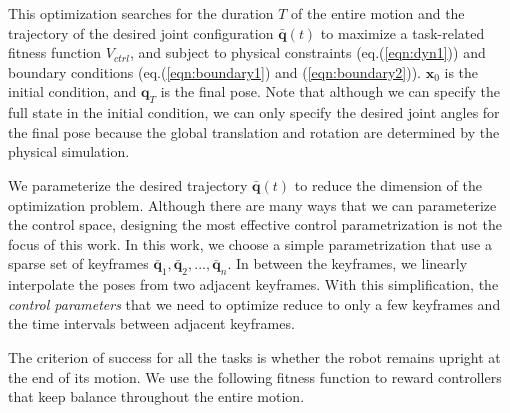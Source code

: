 This optimization searches for the duration $T$ of the entire motion and the trajectory of the desired joint configuration $\bar{\mathbf{q}}(t)$ to maximize a task-related fitness function $V_{ctrl}$, and subject to physical constraints (eq.(\ref{eqn:dyn1})) and boundary conditions (eq.(\ref{eqn:boundary1}) and (\ref{eqn:boundary2})). $\mathbf{x}_0$ is the initial condition, and $\mathbf{q}_T$ is the final pose. Note that although we can specify the full state in the initial condition, we can only specify the desired joint angles for the final pose because the global translation and rotation are determined by the physical simulation.

We parameterize the desired trajectory $\bar{\mathbf{q}}(t)$ to reduce the dimension of the optimization problem. Although there are many ways that we can parameterize the control space, designing the most effective control parametrization is not the focus of this work. In this work, we choose a simple parametrization that use a sparse set of keyframes $\bar{\mathbf{q}}_1, \bar{\mathbf{q}}_2, ..., \bar{\mathbf{q}}_n$. In between the keyframes, we linearly interpolate the poses from two adjacent keyframes. With this simplification, the \emph{control parameters} that we need to optimize reduce to only a few keyframes and the time intervals between adjacent keyframes.


The criterion of success for all the tasks is whether the robot remains upright at the end of its motion. We use the following fitness function to reward controllers that keep balance throughout the entire motion.


